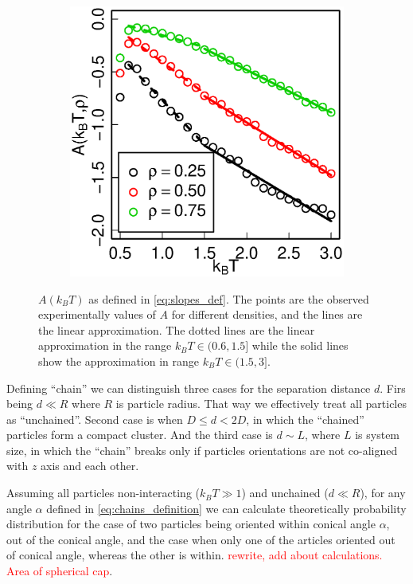 \begin{figure}[h]
\centering
\begin{subfigure}[t]{0.49\textwidth}
	\centering
	\includegraphics[width=\textwidth]{Images/distCorSlopes}
\end{subfigure}
	\captionsetup{justification=centering, width=0.9\columnwidth}
	\caption{$A(k_BT)$ as defined in \eqref{eq:slopes_def}. The points are the observed experimentally values of $A$ for different densities, and the lines are the linear approximation. The dotted lines are the linear approximation in the range $k_BT \in (0.6, 1.5]$ while the solid lines show the approximation in range $k_BT \in (1.5, 3]$.}
	\label{fig:dist_corr_eq_slopes}
\end{figure}

Defining ``chain'' we can distinguish three cases for the separation distance $d$. Firs being $d \ll R$ where $R$ is particle radius. That way we effectively treat all particles as ``unchained''. Second case is when $D \leq d < 2 D$, in which the ``chained'' particles form a compact cluster. And the third case is $d \sim L$, where $L$ is system size, in which the ``chain'' breaks only if particles orientations are not co-aligned with $z$ axis and each other.

Assuming all particles non-interacting ($k_BT \gg 1$) and unchained ($d \ll R$), for any angle $\alpha$ defined in \eqref{eq:chains_definition} we can calculate theoretically probability distribution for the case of two particles being oriented within conical angle $\alpha$, out of the conical angle, and the case when only one of the articles oriented out of conical angle, whereas the other is within. \textcolor{red}{rewrite, add about calculations. Area of spherical cap}.

